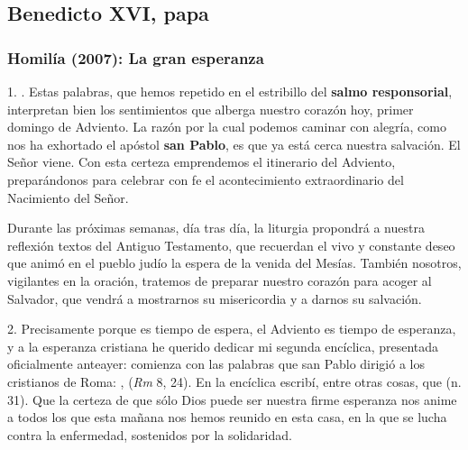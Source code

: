 \newsection
	
		\subsection{Benedicto XVI, papa}
	
			\subsubsection{Homilía (2007): La gran esperanza}
			
				
				\begin{body}
					1. . Estas palabras, que hemos repetido en el estribillo del \textbf{salmo responsorial}, interpretan bien los sentimientos que alberga nuestro corazón hoy, primer domingo de Adviento. La razón por la cual podemos caminar con alegría, como nos ha exhortado el apóstol \textbf{san Pablo}, es que ya está cerca nuestra salvación. El Señor viene. Con esta certeza emprendemos el itinerario del Adviento, preparándonos para celebrar con fe el acontecimiento extraordinario del Nacimiento del Señor. 
					
					Durante las próximas semanas, día tras día, la liturgia propondrá a nuestra reflexión textos del Antiguo Testamento, que recuerdan el vivo y constante deseo que animó en el pueblo judío la espera de la venida del Mesías. También nosotros, vigilantes en la oración, tratemos de preparar nuestro corazón para acoger al Salvador, que vendrá a mostrarnos su misericordia y a darnos su salvación. 
					
					2. Precisamente porque es tiempo de espera, el Adviento es tiempo de esperanza, y a la esperanza cristiana he querido dedicar mi segunda encíclica, presentada oficialmente anteayer: comienza con las palabras que san Pablo dirigió a los cristianos de Roma: \emph{},  (\emph{Rm} 8, 24). En la encíclica escribí, entre otras cosas, que  (n. 31). Que la certeza de que sólo Dios puede ser nuestra firme esperanza nos anime a todos los que esta mañana nos hemos reunido en esta casa, en la que se lucha contra la enfermedad, sostenidos por la solidaridad. 
					

\end{body}
